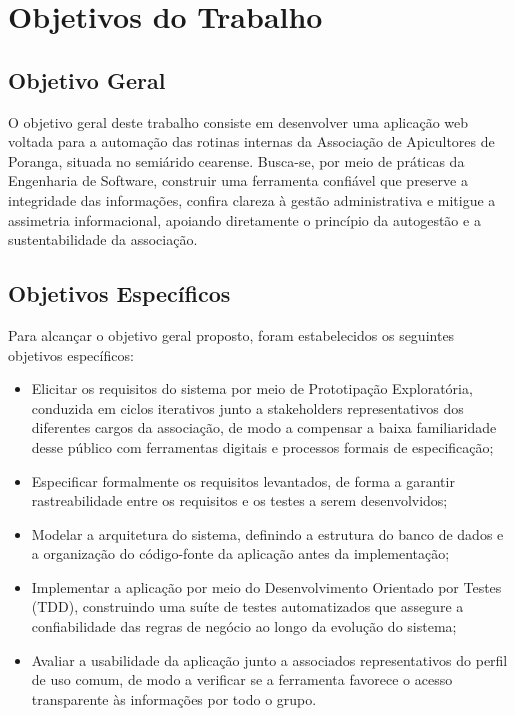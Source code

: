 \section{Objetivos do Trabalho}
\label{sec:objetivos}

\subsection{Objetivo Geral}

O objetivo geral deste trabalho consiste em desenvolver uma aplicação web voltada para a automação das rotinas internas da Associação de Apicultores de Poranga, situada no semiárido cearense. Busca-se, por meio de práticas da Engenharia de Software, construir uma ferramenta confiável que preserve a integridade das informações, confira clareza à gestão administrativa e mitigue a assimetria informacional, apoiando diretamente o princípio da autogestão e a sustentabilidade da associação.

\subsection{Objetivos Específicos}

Para alcançar o objetivo geral proposto, foram estabelecidos os seguintes objetivos específicos:

\begin{itemize}
    \item Elicitar os requisitos do sistema por meio de Prototipação Exploratória, conduzida em ciclos iterativos junto a stakeholders representativos dos diferentes cargos da associação, de modo a compensar a baixa familiaridade desse público com ferramentas digitais e processos formais de especificação;
    \item Especificar formalmente os requisitos levantados, de forma a garantir rastreabilidade entre os requisitos e os testes a serem desenvolvidos;
    \item Modelar a arquitetura do sistema, definindo a estrutura do banco de dados e a organização do código-fonte da aplicação antes da implementação;
    \item Implementar a aplicação por meio do Desenvolvimento Orientado por Testes (TDD), construindo uma suíte de testes automatizados que assegure a confiabilidade das regras de negócio ao longo da evolução do sistema;
    \item Avaliar a usabilidade da aplicação junto a associados representativos do perfil de uso comum, de modo a verificar se a ferramenta favorece o acesso transparente às informações por todo o grupo.
\end{itemize}

